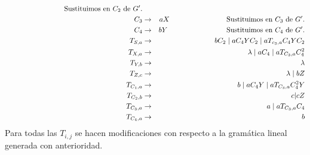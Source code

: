 \documentclass{article}
\begin{document}
\begin{enumerate}
\begin{eqnarray*}
      \hspace*{2.9cm} \text{Sustituimos en } C_2 \text{ de } G'.\\
      C_3 &\rightarrow& aX
      \hspace*{2.8cm} \text{Sustituimos en } C_3 \text{ de } G'.\\
      C_4 &\rightarrow& bY
      \hspace*{2.9cm} \text{Sustituimos en } C_4 \text{ de } G'.\\
      T_{S,a} &\rightarrow& b C_2\; |\; a C_4 Y C_2\; |\; a T_{c_3, a} C_4 Y C_2\\
      T_{X,a} &\rightarrow& \lambda\; |\; a C_4\; |\; a T_{C_3, a} C_4^2\\
      T_{Y,b} &\rightarrow& \lambda\\
      T_{Z,c} &\rightarrow& \lambda\; |\; bZ\\
      T_{C_1,a} &\rightarrow& b\; |\; a C_4 Y\; |\; a T_{C_3,a} C_4^2 Y\\
      T_{C_2,b} &\rightarrow& c|cZ\\
      T_{C_3,a} &\rightarrow& a\; |\; a T_{C_3, a} C_4\\
      T_{C_4,a} &\rightarrow& b
    \end{eqnarray*}
    Para todas las $T_{i,j}$ se hacen modificaciones con respecto a la gramática lineal
    generada con anterioridad.
    

\end{enumerate}
\end{document}
